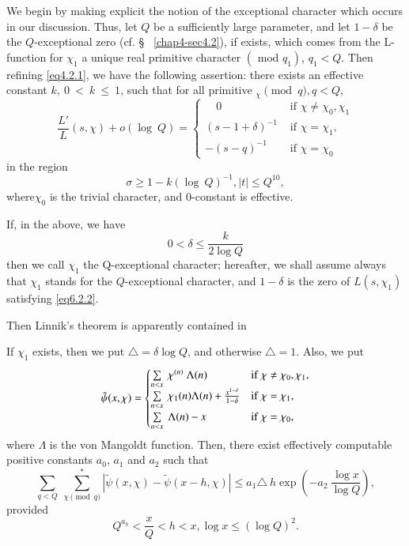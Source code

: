We begin by making explicit the notion of the exceptional character
which occurs in our discussion. Thus, let $Q$ be a sufficiently large
parameter, and let $1 - \delta$ be the $Q$-exceptional zero (cf. \S~
\ref{chap4-sec4.2}), if exists, which comes from the L-function for $\chi_1$ a
unique real primitive character $(\text{ mod } q_1)$, $q_1 < Q$. Then
refining \eqref{eq4.2.1}, we have the following assertion:  there exists an
effective constant $k,~ 0~ < ~k ~\le ~1$, such that for all primitive
$_{\chi} \pmod{q}, q < Q$, 
\begin{equation*}
  \frac{L'}{L}(s,\chi)+o(\log ~ Q) =
  \begin{cases}
    \quad 0  & \text{ if } \chi \neq \chi_0,\chi_1\\
    (s-1+\delta)^{-1} & \text{ if } \chi = \chi_1,\\
    -(s-q)^{-1} & \text{ if } \chi = \chi_0
  \end{cases}
  \tag{6.2.1}\label{eq6.2.1}
\end{equation*}
in the region
$$
\sigma \geq 1 - k(\log ~ Q)^{-1}, | t | \leq Q^{10},
$$
where\pageoriginale $\chi_0$ is the trivial character, and $0$-constant is effective.

If, in the above, we have
\begin{equation*}
  0 < \delta \leq \frac{k}{2 \log Q}\tag{6.2.2}\label{eq6.2.2}
\end{equation*}
then we call $\chi_1$ the Q-exceptional character; hereafter, we shall
assume always that $\chi_1$ stands for the $Q$-exceptional character,
and $1-\delta$ is the zero of $L(s,\chi_1)$ satisfying \eqref{eq6.2.2}. 

Then Linnik's theorem is apparently contained in 
\begin{theorem}\label{chap6-thm17}%
  If $\chi_1$ exists, then we put $\triangle = \delta \log Q$, and
  otherwise $\triangle = 1$. Also, we put 
  \begin{equation*}
  \tilde{\psi}(x,\chi) =
  \begin{cases}
    \sum\limits_{n < x} ~ \chi^{(n)} ~ \Lambda(n) & {\rm if } ~
    \chi \neq \chi_0,\chi_1,\\ 
    \sum\limits_{n < x } ~ \chi_{1}(n)\Lambda (n)+
    \frac{x^{1-\delta}}{1-\delta} & {\rm if }~ \chi =
    \chi_1,\\ 
    \sum\limits_{n < x} ~ \Lambda(n) -x &  \rm{ if }~ \chi = \chi_0,
  \end{cases}
\end{equation*}
where $\Lambda$ is the von Mangoldt function. Then, there exist
effectively computable positive constants $a_0$, $a_1$ and $a_2$ such
that 
$$
\sum_{q < Q} ~ \sum_{\chi{ \pmod{q}}}^*  | \tilde{\psi}(x,\chi) -
\tilde{\psi}(x-h,\chi) | \leq  a_1 \triangle ~h  \exp
\left(-a_2~\frac{\log  x}{\log Q}\right), 
$$
provided\pageoriginale
$$
Q^{a_0} < \frac{x}{Q} < h < x, \log x \leq (\log Q)^2.
$$
\end{theorem}

